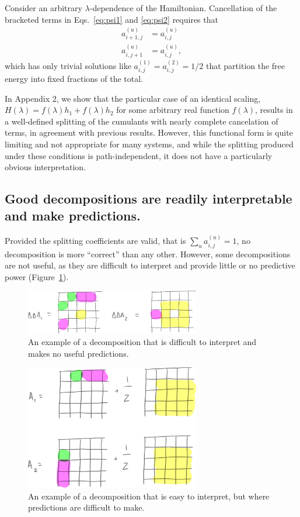 \documentclass{article}
\begin{document}
Consider an arbitrary $\lambda$-dependence of the Hamiltonian. Cancellation of the bracketed terms in Eqs.~\ref{eq:psi1} and \ref{eq:psi2} requires that
\begin{align*}
a_{i+1,j}^{(u)} &= a_{i,j}^{(u)} \\
a_{i,j+1}^{(u)} &= a_{i,j}^{(u)},
\end{align*}
which has only trivial solutions like $a_{i,j}^{(1)} = a_{i,j}^{(2)} = 1/2$ that partition the free energy into fixed fractions of the total.

In Appendix 2, we show that the particular case of an identical scaling, $H(\lambda) = f(\lambda)h_1 + f(\lambda)h_2$ for some arbitrary real function $f(\lambda)$, results in a well-defined splitting of the cumulants with nearly complete cancelation of terms, in agreement with previous results. However, this functional form is quite limiting and not appropriate for many systems, and while the splitting produced under these conditions is path-independent, it does not have a particularly obvious interpretation.








\subsection{Good decompositions are readily interpretable and make predictions.}

Provided the splitting coefficients are valid, that is $\sum_u a_{i,j}^{(u)}=1$, no decomposition is more ``correct'' than any other. However, some decompositions are not useful, as they are difficult to interpret and provide little or no predictive power (Figure~\ref{fig:bad_split}).

\begin{figure}[tb]
\centering
\includegraphics[width=3in]{figure6.pdf}
\caption{An example of a decomposition that is difficult to interpret and makes no useful predictions.}
\label{fig:bad_split}
\end{figure}

\begin{figure}[tb]
\centering
\includegraphics[width=3in]{figure4.pdf}
\caption{An example of a decomposition that is easy to interpret, but where predictions are difficult to make.}
\label{fig:ok_split}
\end{figure}
\end{document}
